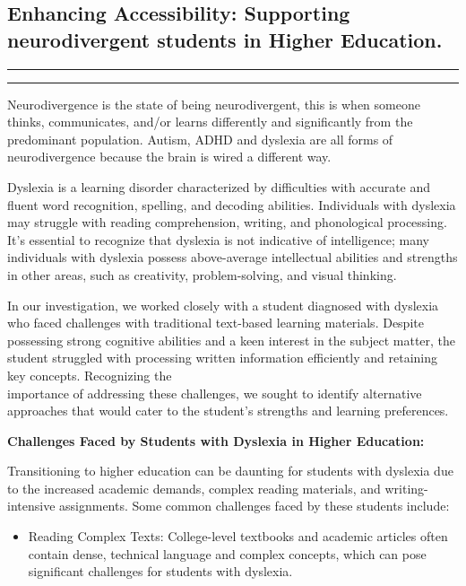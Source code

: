 \documentclass[a4paper,12pt]{article}
\begin{document}

\begin{large}


\begin{center}
\section*{Enhancing Accessibility: Supporting neurodivergent students in Higher Education.}
\end{center}

\bigskip


\hrule height 1pt
\vskip 3pt \hrule
\medskip
\medskip

\medskip

Neurodivergence is the state of being neurodivergent, this is when someone thinks, communicates, and/or learns differently and significantly from the predominant population. Autism, ADHD and dyslexia are all forms of neurodivergence because the brain is wired a different way.

Dyslexia is a learning disorder characterized by difficulties with accurate and fluent word recognition, spelling, and decoding abilities. Individuals with dyslexia may struggle with reading comprehension, writing, and phonological processing. It's essential to recognize that dyslexia is not indicative of intelligence; many individuals with dyslexia possess above-average intellectual abilities and strengths in other areas, such as creativity, problem-solving, and visual thinking.

In our investigation, we worked closely with a student diagnosed with dyslexia who faced challenges with traditional text-based learning materials. Despite possessing strong cognitive abilities and a keen interest in the subject matter, the student struggled with processing written information efficiently and retaining key concepts. Recognizing the\\ importance of addressing these challenges, we sought to identify alternative approaches that would cater to the student's strengths and learning preferences.

\textbf{Challenges Faced by Students with Dyslexia in Higher Education:}

Transitioning to higher education can be daunting for students with dyslexia due to the increased academic demands, complex reading materials, and writing-intensive assignments. Some common challenges faced by these students include:

\begin{itemize}
\item Reading Complex Texts: College-level textbooks and academic articles often contain dense, technical language and complex concepts, which can pose significant challenges for students with dyslexia.


\end{itemize}
\end{large}
\end{document}
